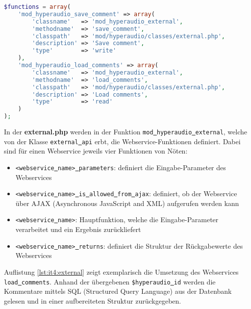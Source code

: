 \begin{lstlisting}[language=php,
             linewidth=\textwidth,
             caption={\textbf{services.php} in der 4. Iteration},
             label={lst:it4:services}]
$functions = array(
    'mod_hyperaudio_save_comment' => array(
        'classname'   => 'mod_hyperaudio_external',
        'methodname'  => 'save_comment',
        'classpath'   => 'mod/hyperaudio/classes/external.php',
        'description' => 'Save comment',
        'type'        => 'write'
    ),
    'mod_hyperaudio_load_comments' => array(
        'classname'   => 'mod_hyperaudio_external',
        'methodname'  => 'load_comments',
        'classpath'   => 'mod/hyperaudio/classes/external.php',
        'description' => 'Load comments',
        'type'        => 'read'
    )
);
\end{lstlisting}

In der \textbf{external.php} werden in der Funktion \texttt{mod\underline{{ }}hyperaudio\underline{{ }}external}, welche von der Klasse \texttt{external\underline{{ }}api} erbt, die Webservice-Funktionen definiert. Dabei sind für einen Webservice jeweils vier Funktionen von Nöten:

\begin{itemize}
\item \texttt{<webservice\underline{{ }}name>\underline{{ }}parameters}: definiert die Eingabe-Parameter des Webservices
\item \texttt{<webservice\underline{{ }}name>\underline{{ }}is\underline{{ }}allowed\underline{{ }}from\underline{{ }}ajax}: definiert, ob der Webservice über AJAX (Asynchronous JavaScript and XML) aufgerufen werden kann
\item \texttt{<webservice\underline{{ }}name>}: Hauptfunktion, welche die Eingabe-Parameter verarbeitet und ein Ergebnis zurückliefert
\item \texttt{<webservice\underline{{ }}name>\underline{{ }}returns}: definiert die Struktur der Rückgabewerte des Webservices
\end{itemize}

Auflistung \ref{lst:it4:external} zeigt exemplarisch die Umsetzung des Webservices \texttt{load\underline{{ }}comments}. Anhand der übergebenen \texttt{\$hyperaudio\underline{{ }}id} werden die Kommentare mittels SQL (Structured Query Language) aus der Datenbank gelesen und in einer aufbereiteten Struktur zurückgegeben.

